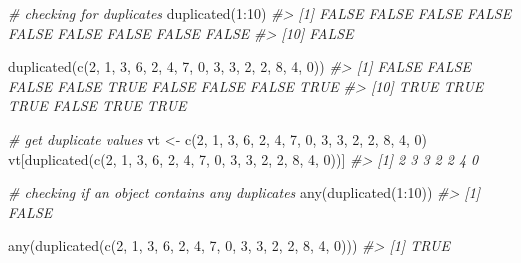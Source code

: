 \documentclass[
]{book}
\newenvironment{Shaded}{\begin{snugshade}}{\end{snugshade}}
\newcommand{\CommentTok}[1]{\textcolor[rgb]{0.56,0.35,0.01}{\textit{#1}}}
\newcommand{\DecValTok}[1]{\textcolor[rgb]{0.00,0.00,0.81}{#1}}
\newcommand{\FunctionTok}[1]{\textcolor[rgb]{0.00,0.00,0.00}{#1}}
\newcommand{\NormalTok}[1]{#1}
\newcommand{\OtherTok}[1]{\textcolor[rgb]{0.56,0.35,0.01}{#1}}
\newcommand{\SpecialCharTok}[1]{\textcolor[rgb]{0.00,0.00,0.00}{#1}}
\begin{document}
\begin{Shaded}
\begin{Highlighting}[]
\CommentTok{\# checking for duplicates}
\FunctionTok{duplicated}\NormalTok{(}\DecValTok{1}\SpecialCharTok{:}\DecValTok{10}\NormalTok{)}
\CommentTok{\#\textgreater{}  [1] FALSE FALSE FALSE FALSE FALSE FALSE FALSE FALSE FALSE}
\CommentTok{\#\textgreater{} [10] FALSE}

\FunctionTok{duplicated}\NormalTok{(}\FunctionTok{c}\NormalTok{(}\DecValTok{2}\NormalTok{, }\DecValTok{1}\NormalTok{, }\DecValTok{3}\NormalTok{, }\DecValTok{6}\NormalTok{, }\DecValTok{2}\NormalTok{, }\DecValTok{4}\NormalTok{, }\DecValTok{7}\NormalTok{, }\DecValTok{0}\NormalTok{, }\DecValTok{3}\NormalTok{, }\DecValTok{3}\NormalTok{, }\DecValTok{2}\NormalTok{, }\DecValTok{2}\NormalTok{, }\DecValTok{8}\NormalTok{, }\DecValTok{4}\NormalTok{, }\DecValTok{0}\NormalTok{))}
\CommentTok{\#\textgreater{}  [1] FALSE FALSE FALSE FALSE  TRUE FALSE FALSE FALSE  TRUE}
\CommentTok{\#\textgreater{} [10]  TRUE  TRUE  TRUE FALSE  TRUE  TRUE}

\CommentTok{\# get duplicate values}
\NormalTok{vt }\OtherTok{\textless{}{-}} \FunctionTok{c}\NormalTok{(}\DecValTok{2}\NormalTok{, }\DecValTok{1}\NormalTok{, }\DecValTok{3}\NormalTok{, }\DecValTok{6}\NormalTok{, }\DecValTok{2}\NormalTok{, }\DecValTok{4}\NormalTok{, }\DecValTok{7}\NormalTok{, }\DecValTok{0}\NormalTok{, }\DecValTok{3}\NormalTok{, }\DecValTok{3}\NormalTok{, }\DecValTok{2}\NormalTok{, }\DecValTok{2}\NormalTok{, }\DecValTok{8}\NormalTok{, }\DecValTok{4}\NormalTok{, }\DecValTok{0}\NormalTok{)}
\NormalTok{vt[}\FunctionTok{duplicated}\NormalTok{(}\FunctionTok{c}\NormalTok{(}\DecValTok{2}\NormalTok{, }\DecValTok{1}\NormalTok{, }\DecValTok{3}\NormalTok{, }\DecValTok{6}\NormalTok{, }\DecValTok{2}\NormalTok{, }\DecValTok{4}\NormalTok{, }\DecValTok{7}\NormalTok{, }\DecValTok{0}\NormalTok{, }\DecValTok{3}\NormalTok{, }\DecValTok{3}\NormalTok{, }\DecValTok{2}\NormalTok{, }\DecValTok{2}\NormalTok{, }\DecValTok{8}\NormalTok{, }\DecValTok{4}\NormalTok{, }\DecValTok{0}\NormalTok{))]}
\CommentTok{\#\textgreater{} [1] 2 3 3 2 2 4 0}

\CommentTok{\# checking if an object contains any duplicates}
\FunctionTok{any}\NormalTok{(}\FunctionTok{duplicated}\NormalTok{(}\DecValTok{1}\SpecialCharTok{:}\DecValTok{10}\NormalTok{))}
\CommentTok{\#\textgreater{} [1] FALSE}

\FunctionTok{any}\NormalTok{(}\FunctionTok{duplicated}\NormalTok{(}\FunctionTok{c}\NormalTok{(}\DecValTok{2}\NormalTok{, }\DecValTok{1}\NormalTok{, }\DecValTok{3}\NormalTok{, }\DecValTok{6}\NormalTok{, }\DecValTok{2}\NormalTok{, }\DecValTok{4}\NormalTok{, }\DecValTok{7}\NormalTok{, }\DecValTok{0}\NormalTok{, }\DecValTok{3}\NormalTok{, }\DecValTok{3}\NormalTok{, }\DecValTok{2}\NormalTok{, }\DecValTok{2}\NormalTok{, }\DecValTok{8}\NormalTok{, }\DecValTok{4}\NormalTok{, }\DecValTok{0}\NormalTok{)))}
\CommentTok{\#\textgreater{} [1] TRUE}


\end{Highlighting}
\end{Shaded}
\end{document}
